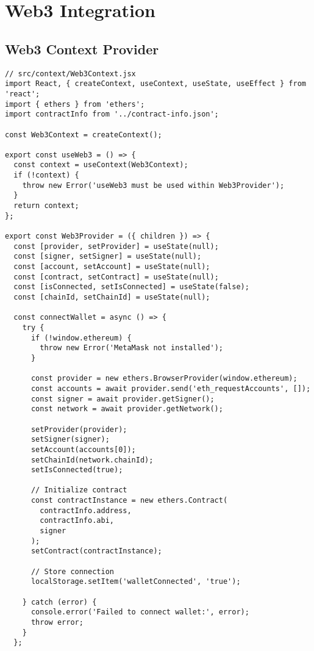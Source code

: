 \documentclass[12pt,a4paper]{article}
\begin{document}
\section{Web3 Integration}

\subsection{Web3 Context Provider}
\begin{lstlisting}[caption=Web3 Context Implementation]
// src/context/Web3Context.jsx
import React, { createContext, useContext, useState, useEffect } from 'react';
import { ethers } from 'ethers';
import contractInfo from '../contract-info.json';

const Web3Context = createContext();

export const useWeb3 = () => {
  const context = useContext(Web3Context);
  if (!context) {
    throw new Error('useWeb3 must be used within Web3Provider');
  }
  return context;
};

export const Web3Provider = ({ children }) => {
  const [provider, setProvider] = useState(null);
  const [signer, setSigner] = useState(null);
  const [account, setAccount] = useState(null);
  const [contract, setContract] = useState(null);
  const [isConnected, setIsConnected] = useState(false);
  const [chainId, setChainId] = useState(null);

  const connectWallet = async () => {
    try {
      if (!window.ethereum) {
        throw new Error('MetaMask not installed');
      }

      const provider = new ethers.BrowserProvider(window.ethereum);
      const accounts = await provider.send('eth_requestAccounts', []);
      const signer = await provider.getSigner();
      const network = await provider.getNetwork();

      setProvider(provider);
      setSigner(signer);
      setAccount(accounts[0]);
      setChainId(network.chainId);
      setIsConnected(true);

      // Initialize contract
      const contractInstance = new ethers.Contract(
        contractInfo.address,
        contractInfo.abi,
        signer
      );
      setContract(contractInstance);

      // Store connection
      localStorage.setItem('walletConnected', 'true');

    } catch (error) {
      console.error('Failed to connect wallet:', error);
      throw error;
    }
  };


\end{lstlisting}
\end{document}
